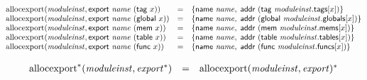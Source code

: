 $$
\begin{array}[t]{@{}lcl@{}l@{}}
{\mathrm{allocexport}}({\mathit{moduleinst}}, \mathsf{export}~{\mathit{name}}~(\mathsf{tag}~x)) & = & \{ \mathsf{name}~{\mathit{name}},\;\allowbreak \mathsf{addr}~(\mathsf{tag}~{\mathit{moduleinst}}{.}\mathsf{tags}{}[x]) \} \\
{\mathrm{allocexport}}({\mathit{moduleinst}}, \mathsf{export}~{\mathit{name}}~(\mathsf{global}~x)) & = & \{ \mathsf{name}~{\mathit{name}},\;\allowbreak \mathsf{addr}~(\mathsf{global}~{\mathit{moduleinst}}{.}\mathsf{globals}{}[x]) \} \\
{\mathrm{allocexport}}({\mathit{moduleinst}}, \mathsf{export}~{\mathit{name}}~(\mathsf{mem}~x)) & = & \{ \mathsf{name}~{\mathit{name}},\;\allowbreak \mathsf{addr}~(\mathsf{mem}~{\mathit{moduleinst}}{.}\mathsf{mems}{}[x]) \} \\
{\mathrm{allocexport}}({\mathit{moduleinst}}, \mathsf{export}~{\mathit{name}}~(\mathsf{table}~x)) & = & \{ \mathsf{name}~{\mathit{name}},\;\allowbreak \mathsf{addr}~(\mathsf{table}~{\mathit{moduleinst}}{.}\mathsf{tables}{}[x]) \} \\
{\mathrm{allocexport}}({\mathit{moduleinst}}, \mathsf{export}~{\mathit{name}}~(\mathsf{func}~x)) & = & \{ \mathsf{name}~{\mathit{name}},\;\allowbreak \mathsf{addr}~(\mathsf{func}~{\mathit{moduleinst}}{.}\mathsf{funcs}{}[x]) \} \\
\end{array}
$$

$$
\begin{array}[t]{@{}lcl@{}l@{}}
{{{\mathrm{allocexport}}^\ast}}{({\mathit{moduleinst}}, {{\mathit{export}}^\ast})} & = & {{\mathrm{allocexport}}({\mathit{moduleinst}}, {\mathit{export}})^\ast} \\
\end{array}
$$

\vspace{1ex}

